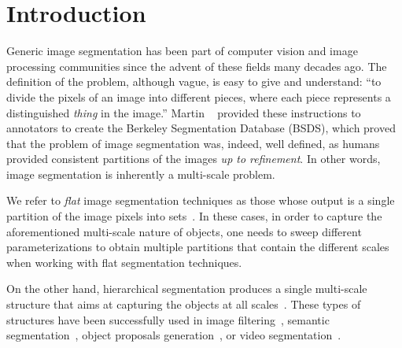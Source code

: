 \section{Introduction}
\label{sec:intro}
Generic image segmentation has been part of computer vision and image processing communities since the
advent of these fields many decades ago.
The definition of the problem, although vague, is easy to give and understand: ``to divide the pixels of an
image into different pieces, where each piece represents a distinguished \textit{thing}
in the image.''
Martin \etal~\cite{Martin2001} provided these instructions to annotators to create
the Berkeley Segmentation Database (BSDS), which proved that the problem of image segmentation was,
indeed, well defined, as humans provided consistent partitions of the images \textit{up to refinement}.
In other words, image segmentation is inherently a multi-scale problem.

We refer to \textit{flat} image segmentation techniques as those whose output is a single partition of the
image pixels into sets~\cite{shi2000normalized,Comaniciu2002,felzenszwalb2004efficient}.
In these cases, in order to capture the aforementioned multi-scale nature of objects,
one needs to sweep different parameterizations to obtain multiple partitions that contain the
different scales when working with flat segmentation techniques.

On the other hand, hierarchical segmentation produces a single multi-scale structure that aims
at capturing the objects at all scales~\cite{arbelaez2011contour,kim2013learning,Salembier2000,Ren2013,arbelaez2014multiscale}. 
These types of structures have been successfully used in image filtering~\cite{Salembier2000},
semantic segmentation~\cite{Lempitsky2011}, object proposals generation~\cite{arbelaez2014multiscale},
or video segmentation~\cite{xu2013flattening,Varas2015}.


